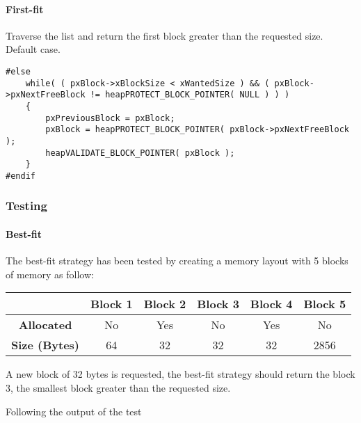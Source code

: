     \paragraph{First-fit} Traverse the list and return the first block greater than the requested size. Default case.

    \begin{codebox}
    \begin{lstlisting}
#else
    while( ( pxBlock->xBlockSize < xWantedSize ) && ( pxBlock->pxNextFreeBlock != heapPROTECT_BLOCK_POINTER( NULL ) ) )
    {
        pxPreviousBlock = pxBlock;
        pxBlock = heapPROTECT_BLOCK_POINTER( pxBlock->pxNextFreeBlock );
        heapVALIDATE_BLOCK_POINTER( pxBlock );
    }
#endif
    \end{lstlisting}
    \end{codebox}

    \subsubsection{Testing}
    \paragraph{Best-fit} The best-fit strategy has been tested by creating a memory layout with 5 blocks of memory as follow:

    \begin{table}[h]
    \centering
    \begin{tabular}{|c|c|c|c|c|c|}
    \hline
    & \textbf{Block 1} & \textbf{Block 2} & \textbf{Block 3} & \textbf{Block 4} & \textbf{Block 5} \\
    \hline
    \textbf{Allocated} & No & Yes & No & Yes & No \\
    \textbf{Size (Bytes)} & 64 & 32 & 32 & 32 & 2856 \\
    \hline
    \end{tabular}
    \end{table}

    A new block of 32 bytes is requested, the best-fit strategy should return the block 3, the smallest block greater than the requested size.

    Following the output of the test

